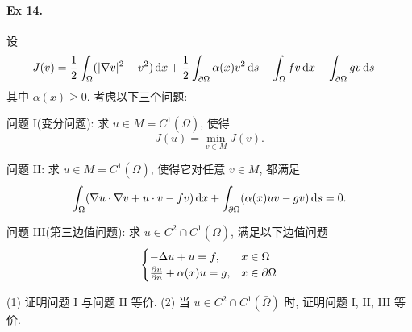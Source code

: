 \paragraph{Ex 14.}
设
\begin{align*}
J(v) &= \frac{1}{2} \int_{\Omega} (|\nabla v|^2 + v^2)\operatorname{d\!} x
    + \frac{1}{2} \int_{\partial \Omega} \alpha(x) v^2 \operatorname{d\!} s
    - \int_{\Omega} fv \operatorname{d\!} x - \int_{\partial \Omega} gv \operatorname{d\!} s
\end{align*}
其中 $\alpha(x) \geq 0$. 考虑以下三个问题:

问题 I(变分问题): 求 $u \in M = C^1(\bar \Omega)$, 使得
\[ J(u)= \min_{v \in M} J(v). \]

问题 II: 求 $u \in M = C^1(\bar \Omega)$, 使得它对任意 $v \in M$, 都满足
\[
\int_{\Omega} (\nabla u \cdot \nabla v + u \cdot v - fv)\operatorname{d\!} x
+ \int_{\partial \Omega} (\alpha(x) uv-gv )\operatorname{d\!} s = 0.
\]

问题 III(第三边值问题): 求 $u \in C^2 \cap C^1(\bar \Omega)$, 满足以下边值问题
\[ \begin{cases}
- \Delta u + u = f, & x \in \Omega \\
{\frac{\partial {u}}{\partial {n}}} + \alpha (x) u = g, & x \in \partial \Omega
\end{cases} \]

(1) 证明问题 I 与问题 II 等价.
(2) 当 $u \in C^2 \cap C^1(\bar \Omega)$ 时, 证明问题 I, II, III 等价.

